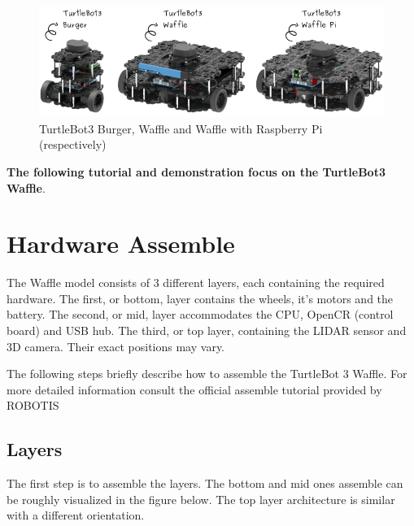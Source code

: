 \documentclass{article}
\begin{document}
 \begin{figure}[h]
 \centering
 \includegraphics[width=1\textwidth]{tb3.png}
 \caption{TurtleBot3 Burger, Waffle and Waffle with Raspberry Pi (respectively)}
 \end{figure}
 
 \textbf{The following tutorial and demonstration focus on the TurtleBot3 Waffle}.
 
 \newpage

 \section{Hardware Assemble} 

 The Waffle model consists of 3 different layers, each containing the required hardware. The first, or bottom, layer contains the wheels, it's motors and the battery. The second, or mid, layer accommodates the CPU, OpenCR (control board) and USB hub. The third, or top layer, containing the LIDAR sensor and 3D camera. Their exact positions may vary.
 
 The following steps briefly describe how to assemble the TurtleBot 3 Waffle. For more detailed information consult the official assemble tutorial provided by ROBOTIS
 
 \subsection{Layers}
 The first step is to assemble the layers. The bottom and mid ones assemble can be roughly visualized in the figure below. The top layer architecture is similar with a different orientation.  
\end{document}
